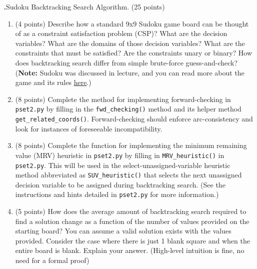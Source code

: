 \documentclass[12pt]{amsart}
\newenvironment{statement}[1]{\smallskip\noindent\color[rgb]{0.0,0.0,0.0} {\bf #1.}}{}
\theoremstyle{definition}
\theoremstyle{remark}
\newcommand{\1}{\mathds{1}}
\begin{document}
\newpage

\begin{statement}{2}
\textit{Sudoku Backtracking Search Algorithm.} (25 points)
\begin{enumerate}

    \item (4 points) Describe how a standard 9x9 Sudoku game board can be thought of as a constraint satisfaction problem (CSP)? What are the decision variables? What are the domains of those decision variables? What are the constraints that must be satisfied? Are the constraints unary or binary? How does backtracking search differ from simple brute-force guess-and-check? (\textbf{Note:} Sudoku was discussed in lecture, and you can read more about the game and its rules \href{https://en.wikipedia.org/wiki/Sudoku}{here}.)
    
    \vspace{1mm}
    
    \item (8 points) Complete the method for implementing forward-checking in \texttt{pset2.py} by filling in the \texttt{fwd\_checking()} method and its helper method \texttt{get\_related\_coords()}. Forward-checking should enforce arc-consistency and look for instances of foreseeable incompatibility.
    
    \vspace{1mm}
    
    \item (8 points) Complete the function for implementing the minimum remaining value (MRV) heuristic in \texttt{pset2.py} by filling in \texttt{MRV\_heuristic()} in \texttt{pset2.py}. This will be used in the select-unassigned-variable heuristic method abbreviated as \texttt{SUV\_heuristic()} that selects the next unassigned decision variable to be assigned during backtracking search. (See the instructions and hints detailed in \texttt{pset2.py} for more information.)
    
    \vspace{1mm}
    
    \item (5 points) How does the average amount of backtracking search required to find a solution change as a function of the number of values provided on the starting board? You can assume a valid solution exists with the values provided. Consider the case where there is just 1 blank square and when the entire board is blank. Explain your answer. (High-level intuition is fine, no need for a formal proof)
    

\end{enumerate}
\end{statement}
\end{document}
